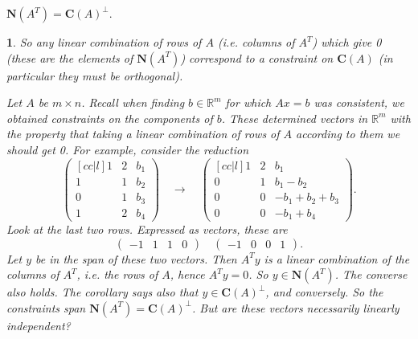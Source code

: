 \documentclass[12pt]{article}
\newtheorem{para}[theorem]{}
\begin{document}
\begin{corollary}
	$\mathbf{N}(A^T)=\mathbf{C}(A)^\perp$.
\end{corollary}

\begin{para} 
	So any linear combination of rows of $A$ (i.e. columns of $A^T$) which give 0 (these are the elements of $\mathbf{N}(A^T)$) correspond to a constraint on $\mathbf{C}(A)$ (in particular they must be orthogonal). 

	Let $A$ be $m\times n$. Recall when finding $b\in\mathbb{R}^m$ for which $Ax=b$ was consistent, we obtained constraints on the components of $b$. These determined vectors in $\mathbb{R}^m$ with the property that taking a linear combination of rows of $A$ according to them we should get 0. For example, consider the reduction 
	\begin{equation*}
		\begin{pmatrix}[cc|l] 1 & 2 & b_1 \\ 1 & 1 & b_2 \\ 0 & 1 & b_3 \\ 1 & 2 & b_4 \end{pmatrix} 
		\quad \to \quad 
		\begin{pmatrix}[cc|l] 1 & 2 & b_1 \\ 0 & 1 & b_1-b_2 \\ 0 & 0 & -b_1+b_2+b_3 \\ 0 & 0 & -b_1+b_4 \end{pmatrix}.
	\end{equation*}
	Look at the last two rows. Expressed as vectors, these are 
	\begin{equation*}
		\begin{pmatrix} -1 & 1 & 1 & 0 \end{pmatrix} \quad \begin{pmatrix} -1 & 0 & 0 & 1 \end{pmatrix}.
	\end{equation*}
	Let $y$ be in the span of these two vectors. Then $A^Ty$ is a linear combination of the columns of $A^T$, i.e. the rows of $A$, hence $A^Ty=0$. So $y\in \mathbf{N}(A^T)$. The converse also holds. The corollary says also that $y\in \mathbf{C}(A)^\perp$, and conversely. So the constraints span $\mathbf{N}(A^T)=\mathbf{C}(A)^\perp$. But are these vectors necessarily linearly independent?
\end{para}	
\end{document}
